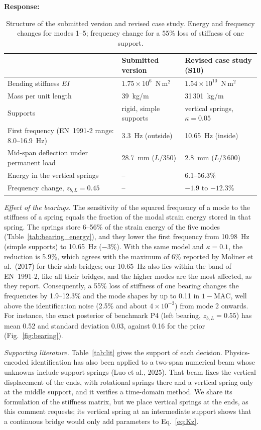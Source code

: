 \documentclass[11pt]{article}
\newenvironment{response}{\par\smallskip\noindent\color{resp}\textbf{Response:}\ }{\par}
\begin{document}
\begin{response}
\begin{table}[H]
\centering\small
\caption{Structure of the submitted version and revised case study. Energy and frequency changes for modes 1--5; frequency change
for a 55\% loss of stiffness of one support.}
\label{tab:old_new}
\footnotesize
\begin{tabular}{p{5.6cm}p{3.9cm}p{5.1cm}}
\toprule
 & Submitted version & Revised case study (S10) \\
\midrule
Bending stiffness $EI$ & $1.75\times10^{6}$~N\,m$^2$ & $1.54\times10^{10}$~N\,m$^2$ \\
Mass per unit length & 39~kg/m & 31\,301~kg/m \\
Supports & rigid, simple supports & vertical springs, $\kappa=0.05$ \\
First frequency (EN~1991-2 range: 8.0--16.9~Hz) & 3.3~Hz (outside) & 10.65~Hz (inside) \\
Mid-span deflection under permanent load & 28.7~mm ($L/350$) & 2.8~mm ($L/3\,600$) \\
Energy in the vertical springs & -- & 6.1--56.3\% \\
Frequency change, $z_{b,L}=0.45$ & -- & $-1.9$ to $-12.3$\% \\
\bottomrule
\end{tabular}
\end{table}

\textit{Effect of the bearings.} The sensitivity of the squared frequency of a mode to the stiffness of a spring equals
the fraction of the modal strain energy stored in that spring. The springs store 6--56\% of the strain energy of the five modes
(Table~\ref{tab:bearing_energy}), and they lower the first frequency from 10.98~Hz (simple supports) to 10.65~Hz ($-3\%$).
With the same model and $\kappa=0.1$, the reduction is 5.9\%, which agrees with the maximum of 6\% reported by Moliner et al.\ (2017)
for their slab bridges; our 10.65~Hz also lies within the band of EN~1991-2, like all their bridges, and the higher modes are the
most affected, as they report. Consequently, a 55\% loss of stiffness of one bearing changes the frequencies by 1.9--12.3\% and the
mode shapes by up to 0.11 in $1-\mathrm{MAC}$, well above the identification noise (2.5\% and about $4\times10^{-3}$) from mode 2
onwards. For instance, the exact posterior of benchmark P4 (left bearing, $z_{b,L}=0.55$) has mean 0.52 and standard deviation
0.03, against 0.16 for the prior (Fig.~\ref{fig:bearing}).

\textit{Supporting literature.} Table~\ref{tab:lit} gives the support of each decision. Physics-encoded identification has also been
applied to a two-span numerical beam whose unknowns include support springs (Luo et al., 2025). That beam fixes the vertical
displacement of the ends, with rotational springs there and a vertical spring only at the middle support, and it verifies a
time-domain method. We share its formulation of the stiffness matrix, but we place vertical springs at the ends, as this comment
requests; its vertical spring at an intermediate support shows that a continuous bridge would only add parameters to Eq.~\eqref{eq:Kz}.


\end{response}
\end{document}
